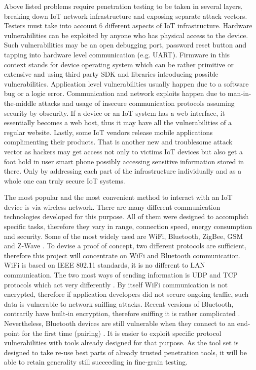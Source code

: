 Above listed problems require penetration testing to be taken in several layers, breaking down IoT network infrastructure and exposing separate attack vectors. Testers must take into account 6 different aspects of IoT infrastructure. Hardware vulnerabilities can be exploited by anyone who has physical access to the device. Such vulnerabilities may be an open debugging port, password reset button and tapping into hardware level communication (e.g. UART)\cite{attify}. Firmware in this context stands for device operating system which can be rather primitive or extensive and using third party SDK and libraries introducing possible vulnerabilities\cite {cookbook}. Application level vulnerabilities usually happen due to a software bug or a logic error\cite{cookbook}. Communication and network exploits happen due to man-in-the-middle attacks and usage of insecure communication protocols assuming security by obscurity. If a device or an IoT system has a web interface, it essentially becomes a web host, thus it may have all the vulnerabilities of a regular website\cite{2007:WAH:1406550}. Lastly, some IoT vendors release mobile applications complimenting their products. That is another new and troublesome attack vector as hackers may get access not only to victims IoT devices but also get a foot hold in user smart phone possibly accessing sensitive information stored in there\cite{cookbook}. Only by addressing each part of the infrastructure individually and as a whole one can truly secure IoT systems.

The most popular and the most convenient method to interact with an IoT device is via wireless network. There are many different communication technologies developed for this purpose. All of them were designed to accomplish specific tasks, therefore they vary in range, connection speed, energy consumption and security. Some of the most widely used are WiFi, Bluetooth, ZigBee, GSM and Z-Wave \cite{cookbook}. To devise a proof of concept, two different protocols are sufficient, therefore this project will concentrate on WiFi and Bluetooth communication. WiFi is based on IEEE 802.11 standards, it is no different to LAN communication. The two most ways of sending information is UDP and TCP protocols which act very differently \cite{4359944}. By itself WiFi communication is not encrypted, therefore if application developers did not secure ongoing traffic, such data is vulnerable to network sniffing attacks. Recent versions of Bluetooth, contrarily have built-in encryption, therefore sniffing it is rather complicated \cite{scarfone2012guide}. Nevertheless, Bluetooth devices are still vulnerable when they connect to an end-point for the first time (pairing) \cite{scarfone2012guide}. It is easier to exploit specific protocol vulnerabilities with tools already designed for that purpose. As the tool set is designed to take re-use best parts of already trusted penetration tools, it will be able to retain generality still succeeding in fine-grain testing.

